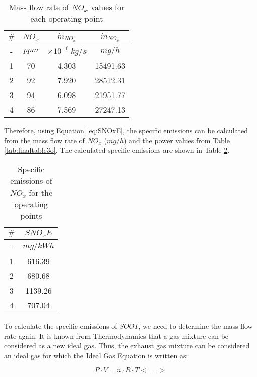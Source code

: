 \documentclass{report}
\begin{document}
\begin{table}[h]
    \centering
    \renewcommand{\arraystretch}{1.2} 
    \begin{tabular}{|c|c|c|c|}
    \hline
    \rowcolor{blue}
    $\#$ & $NO_x$ & $\dot{m}_{NO_x}$ & $\dot{m}_{NO_x}$\\
    \hline
    \rowcolor{gray}
    - & $ppm$ & $\times 10^{-6}\: kg/s$ & $mg/h$\\
    \hline
    1 & 70 & 4.303 & 15491.63\\
    \hline
    2 & 92 & 7.920 & 28512.31\\
    \hline
    3 & 94 & 6.098 & 21951.77\\
    \hline
    4 & 86 & 7.569 & 27247.13\\
    \hline 
    \end{tabular}
    \caption{Mass flow rate of $NO_x$ values for each operating point}
    \label{tab:m.NO_x}
\end{table}

Therefore, using Equation \ref{eq:SNOxE}, the specific emissions can be calculated from the mass flow rate of $NO_x$ ($mg/h$) and the power values from Table \ref{tab:finaltable3o}. The calculated specific emissions are shown in Table \ref{tab:finaltable5oa}.

\begin{table}[!h]
    \centering
    \renewcommand{\arraystretch}{1.2} 
    \begin{tabular}{|c|c|}
    \hline
    \rowcolor{blue}
    $\#$ & $SNO_xE$\\
    \hline
    \rowcolor{gray}
    - & $mg/kWh$\\
    \hline
    1 & 616.39\\
    \hline
    2 & 680.68\\
    \hline
    3 & 1139.26\\
    \hline
    4 & 707.04\\
    \hline 
    \end{tabular}
    \caption{Specific emissions of $NO_x$ for the operating points}
    \label{tab:finaltable5oa}
\end{table}

To calculate the specific emissions of $SOOT$, we need to determine the mass flow rate again. It is known from Thermodynamics that a gas mixture can be considered as a new ideal gas. Thus, the exhaust gas mixture can be considered an ideal gas for which the Ideal Gas Equation is written as:

$$P\cdot V=n\cdot R\cdot T<=>$$
\end{document}
